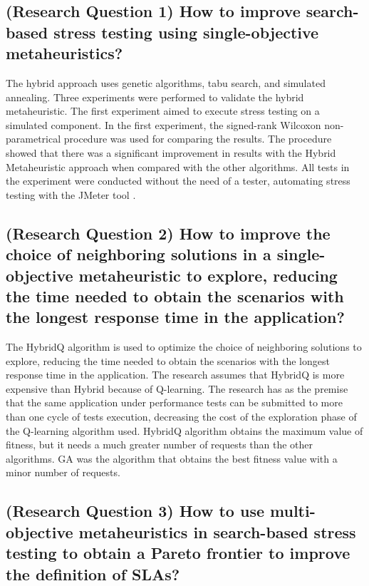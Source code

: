 \documentclass[espaco=umemeio,chapter=TITLE,twoside,openright]{abnt}
\begin{document}
\subsection{(Research Question 1) How to improve search-based stress testing using single-objective metaheuristics?}


The hybrid approach uses genetic algorithms, tabu search, and simulated annealing. Three experiments were performed to validate the hybrid metaheuristic. The first experiment aimed to execute stress testing on a simulated component. In the first experiment, the signed-rank Wilcoxon non-parametrical procedure was used for comparing the results. The procedure showed that there was a significant improvement in  results with the Hybrid Metaheuristic approach when compared with the other algorithms. All tests in the experiment were conducted without the need of a tester, automating  stress testing with the JMeter tool \cite{Gois2016}. 



\subsection{(Research Question 2) How to improve the choice of neighboring solutions in a single-objective metaheuristic to explore, reducing the time needed to obtain the scenarios with the longest response time in the application?}


The HybridQ algorithm is used to optimize the choice of neighboring solutions to explore, reducing the time needed to obtain the scenarios with the longest response time in the application. The research assumes that HybridQ is more expensive than Hybrid because of Q-learning. The research has as the premise that the same application under performance tests can be submitted to more than one cycle of tests execution, decreasing the cost of the exploration phase of the Q-learning algorithm used. HybridQ algorithm obtains the maximum value of fitness, but it needs a much greater number of requests than the other algorithms. GA was the algorithm that obtains the best fitness value with a minor number of requests. 


\subsection{(Research Question 3) How to use multi-objective metaheuristics in search-based stress testing to obtain a Pareto frontier to improve the definition of SLAs?}
\end{document}
